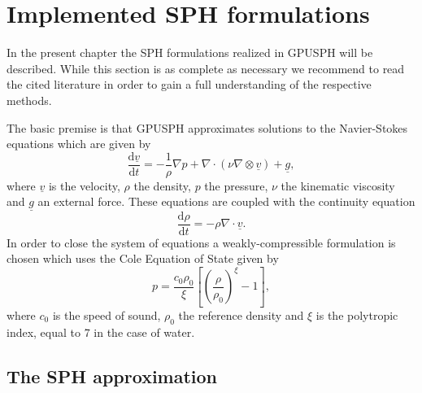 \documentclass[12pt]{memoir}
\newcommand{\uvec}[1]{\underline{#1}}
\newcommand{\td}{\text{d}}
\newcommand{\tdv}[2]{\frac{\td #1}{\td #2}}
\begin{document}
\chapter{Implemented SPH formulations}

In the present chapter the SPH formulations realized in GPUSPH will be
described. While this section is as complete as necessary we recommend
to read the cited literature in order to gain a full understanding of
the respective methods.

The basic premise is that GPUSPH approximates solutions to the
Navier-Stokes equations which are given by
\begin{equation}
\tdv{\uvec{v}}{t} = -\frac{1}{\rho}\nabla p + \nabla \cdot (\nu
\nabla \otimes \uvec{v}) + \uvec{g},
\label{e:sph:ns}
\end{equation}
where $\uvec{v}$ is the velocity, $\rho$ the density, $p$ the
pressure, $\nu$ the kinematic viscosity and $\uvec{g}$ an external
force. These equations are coupled with the continuity equation
\begin{equation}
\tdv{\rho}{t} = - \rho \nabla \cdot \uvec{v}.
\label{e:sph:cont}
\end{equation}
In order to close the system of equations a weakly-compressible
formulation is chosen which uses the Cole Equation of State given by
\begin{equation}
p = \frac{c_0 \rho_0}{\xi}\left[ \left( \frac{\rho}{\rho_0}\right)^\xi
-1 \right],
\label{e:sph:eos}
\end{equation}
where $c_0$ is the speed of sound, $\rho_0$ the reference density and
$\xi$ is the polytropic index, equal to 7 in the case of water.

\section{The SPH approximation}
\end{document}
